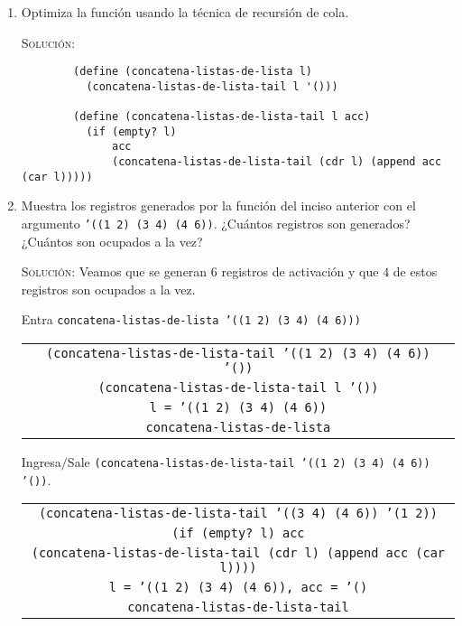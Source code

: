 \documentclass[letterpaper,11pt]{article}
\begin{document}
\begin{enumerate}
\begin{enumerate}
        \item Optimiza la función usando la técnica de recursión de cola.

        \textsc{Solución:}
        \begin{verbatim}
        (define (concatena-listas-de-lista l)
          (concatena-listas-de-lista-tail l '()))
          
        (define (concatena-listas-de-lista-tail l acc)
          (if (empty? l)
              acc
              (concatena-listas-de-lista-tail (cdr l) (append acc (car l)))))
        \end{verbatim}

        \item Muestra los registros generados por la función del inciso anterior
        con el argumento \texttt{'((1 2) (3 4) (4 6))}. ¿Cuántos registros son
        generados? ¿Cuántos son ocupados a la vez?

        \textsc{Solución:} Veamos que se generan $6$ registros de activación y 
        que $4$ de estos registros son ocupados a la vez.

        Entra \texttt{concatena-listas-de-lista '((1 2) (3 4) (4 6)))}
        \begin{center}
            \begin{tabular}{|c|}
                \hline
                \texttt{(concatena-listas-de-lista-tail 
                '((1 2) (3 4) (4 6)) '())} \\
                \texttt{(concatena-listas-de-lista-tail l '())} \\
                \texttt{l = '((1 2) (3 4) (4 6))} \\
                \texttt{concatena-listas-de-lista} \\
                \hline
            \end{tabular}
        \end{center}

        Ingresa$/$Sale \texttt{(concatena-listas-de-lista-tail 
        '((1 2) (3 4) (4 6)) '())}.
        \begin{center}
            \begin{tabular}[h]{|c|}
                \hline
                \texttt{(concatena-listas-de-lista-tail '((3 4) (4 6))
                '(1 2))} \\
                \texttt{(if (empty? l) acc} \\
                \texttt{(concatena-listas-de-lista-tail (cdr l) 
                (append acc (car l))))} \\
                \texttt{l = '((1 2) (3 4) (4 6)), acc = '()} \\
                \texttt{concatena-listas-de-lista-tail} \\
                \hline
            \end{tabular}
        \end{center}


\end{enumerate}
\end{enumerate}
\end{document}
